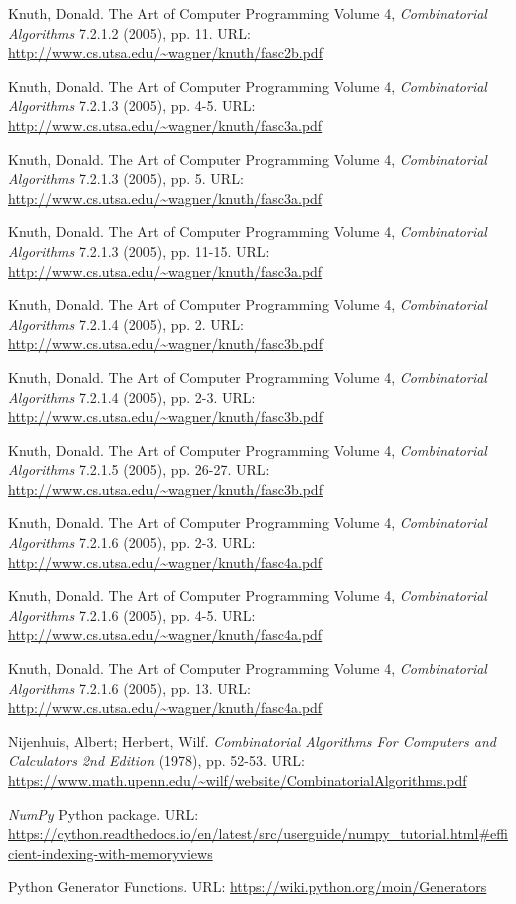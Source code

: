 \documentclass[12pt]{article}
\begin{document}
\begin{thebibliography}{00}
Knuth, Donald. The Art of Computer Programming Volume 4, \textit{Combinatorial Algorithms} 7.2.1.2 (2005), pp. 11. URL: \url{http://www.cs.utsa.edu/~wagner/knuth/fasc2b.pdf}

Knuth, Donald. The Art of Computer Programming Volume 4, \textit{Combinatorial Algorithms} 7.2.1.3 (2005), pp. 4-5. URL: \url{http://www.cs.utsa.edu/~wagner/knuth/fasc3a.pdf}

Knuth, Donald. The Art of Computer Programming Volume 4, \textit{Combinatorial Algorithms} 7.2.1.3 (2005), pp. 5. URL: \url{http://www.cs.utsa.edu/~wagner/knuth/fasc3a.pdf}

Knuth, Donald. The Art of Computer Programming Volume 4, \textit{Combinatorial Algorithms} 7.2.1.3 (2005), pp. 11-15. URL: \url{http://www.cs.utsa.edu/~wagner/knuth/fasc3a.pdf}

Knuth, Donald. The Art of Computer Programming Volume 4, \textit{Combinatorial Algorithms} 7.2.1.4 (2005), pp. 2. URL: \url{http://www.cs.utsa.edu/~wagner/knuth/fasc3b.pdf}

Knuth, Donald. The Art of Computer Programming Volume 4, \textit{Combinatorial Algorithms} 7.2.1.4 (2005), pp. 2-3. URL: \url{http://www.cs.utsa.edu/~wagner/knuth/fasc3b.pdf}

Knuth, Donald. The Art of Computer Programming Volume 4, \textit{Combinatorial Algorithms} 7.2.1.5 (2005), pp. 26-27. URL: \url{http://www.cs.utsa.edu/~wagner/knuth/fasc3b.pdf}

Knuth, Donald. The Art of Computer Programming Volume 4, \textit{Combinatorial Algorithms} 7.2.1.6 (2005), pp. 2-3. URL: \url{http://www.cs.utsa.edu/~wagner/knuth/fasc4a.pdf}

Knuth, Donald. The Art of Computer Programming Volume 4, \textit{Combinatorial Algorithms} 7.2.1.6 (2005), pp. 4-5. URL: \url{http://www.cs.utsa.edu/~wagner/knuth/fasc4a.pdf}

Knuth, Donald. The Art of Computer Programming Volume 4, \textit{Combinatorial Algorithms} 7.2.1.6 (2005), pp. 13. URL: \url{http://www.cs.utsa.edu/~wagner/knuth/fasc4a.pdf}

Nijenhuis, Albert; Herbert, Wilf. \textit{Combinatorial Algorithms For Computers and Calculators 2nd Edition} (1978), pp. 52-53. URL: \url{https://www.math.upenn.edu/~wilf/website/CombinatorialAlgorithms.pdf}

\textit{NumPy} Python package. URL: \url{https://cython.readthedocs.io/en/latest/src/userguide/numpy_tutorial.html#efficient-indexing-with-memoryviews}

Python Generator Functions. URL: \url{https://wiki.python.org/moin/Generators}

\end{thebibliography}
\end{document}
